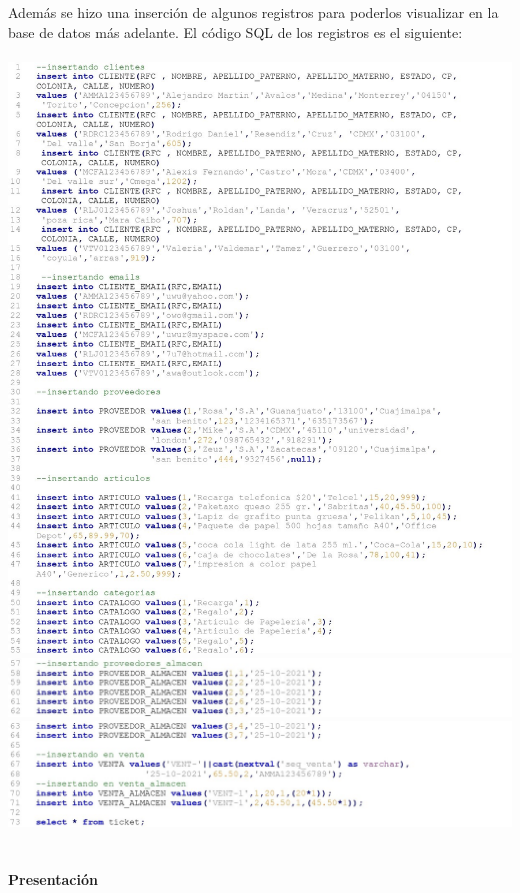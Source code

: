 \documentclass[letter,12pt]{article} %
\begin{document}
\newpage
Además se hizo una inserción de algunos registros para poderlos visualizar en la base de datos más adelante. El código SQL de los registros es el siguiente:
\\\\
\includegraphics[scale=0.85]{imagenes/DML01.jpg}
\newpage
\includegraphics[scale=0.85]{imagenes/DML02-1.jpg}
\includegraphics[scale=0.85]{imagenes/DML02-2.jpg}
\\\\\\
\large{ \textbf{Presentaci\'on}}
\\\\
\end{document}
